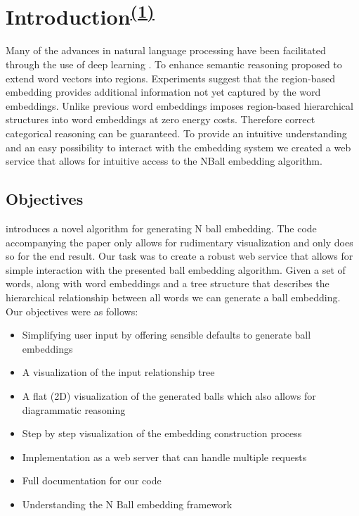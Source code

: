 \chapter[Introduction]{Introduction\textsuperscript{\hyperref[Jan]{(1)}}}

Many of the advances in natural language processing have been facilitated through the use of deep learning \cite{mikolov2013efficient,devlin2019bert,raffel2020exploring}. To enhance semantic reasoning \cite{Erk} proposed to extend word vectors into regions. Experiments suggest that the region-based embedding provides additional information not yet captured by the word embeddings. Unlike previous word embeddings \cite{dong2018encoding} imposes region-based hierarchical structures into word embeddings at zero energy costs. Therefore correct categorical reasoning can be guaranteed. To provide an intuitive understanding and an easy possibility to interact with the embedding system we created a web service that allows for intuitive access to the NBall embedding algorithm. 

\section{Objectives}
\label{objectives}
\cite{dong2018encoding} introduces a novel algorithm for generating N ball embedding. The code accompanying the paper only allows for rudimentary visualization and only does so for the end result. Our task was to create a robust web service that allows for simple interaction with the presented ball embedding algorithm. 
Given a set of words, along with word embeddings and a tree structure that describes the hierarchical relationship between all words we can generate a ball embedding. \\

Our objectives were as follows:
\begin{itemize}
	\item Simplifying user input by offering sensible defaults to generate ball embeddings
	\item A visualization of the input relationship tree
	\item A flat (2D) visualization of the generated balls which also allows for diagrammatic reasoning
	\item Step by step visualization of the embedding construction process
	\item Implementation as a web server that can handle multiple requests
	\item Full documentation for our code
	\item Understanding the N Ball embedding framework
\end{itemize}


